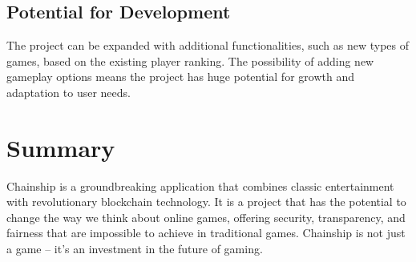\documentclass{article}
\begin{document}
\subsection{Potential for Development}

The project can be expanded with additional functionalities, such as new types of games, based on the existing player ranking. The possibility of adding new gameplay options means the project has huge potential for growth and adaptation to user needs.

\section{Summary}

Chainship is a groundbreaking application that combines classic entertainment with revolutionary blockchain technology. It is a project that has the potential to change the way we think about online games, offering security, transparency, and fairness that are impossible to achieve in traditional games. Chainship is not just a game – it's an investment in the future of gaming.
\end{document}
